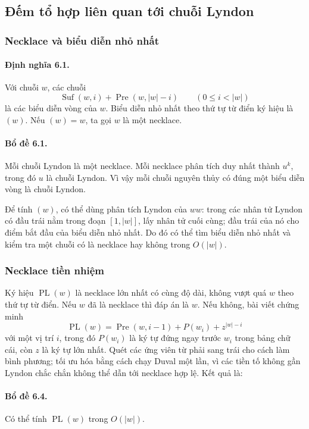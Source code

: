 \documentclass[11pt]{article}
\begin{document}
\subsection{Đếm tổ hợp liên quan tới chuỗi Lyndon}

\subsubsection{Necklace và biểu diễn nhỏ nhất}

\paragraph{Định nghĩa 6.1.}
Với chuỗi $w$, các chuỗi
\[
  \operatorname{Suf}(w,i)+\operatorname{Pre}(w,|w|-i)
  \qquad (0\le i<|w|)
\]
là các biểu diễn vòng của $w$. Biểu diễn nhỏ nhất theo thứ tự từ điển ký hiệu là
$(w)$. Nếu $(w)=w$, ta gọi $w$ là một necklace.

\paragraph{Bổ đề 6.1.}
Mỗi chuỗi Lyndon là một necklace. Mỗi necklace phân tích duy nhất thành $u^k$,
trong đó $u$ là chuỗi Lyndon. Vì vậy mỗi chuỗi nguyên thủy có đúng một biểu diễn
vòng là chuỗi Lyndon.

Để tính $(w)$, có thể dùng phân tích Lyndon của $ww$: trong các nhân tử Lyndon
có đầu trái nằm trong đoạn $[1,|w|]$, lấy nhân tử cuối cùng; đầu trái của nó cho
điểm bắt đầu của biểu diễn nhỏ nhất. Do đó có thể tìm biểu diễn nhỏ nhất và kiểm
tra một chuỗi có là necklace hay không trong $O(|w|)$.

\subsubsection{Necklace tiền nhiệm}

Ký hiệu $\operatorname{PL}(w)$ là necklace lớn nhất có cùng độ dài, không vượt
quá $w$ theo thứ tự từ điển. Nếu $w$ đã là necklace thì đáp án là $w$. Nếu không,
bài viết chứng minh
\[
  \operatorname{PL}(w)
  =
  \operatorname{Pre}(w,i-1)+P(w_i)+z^{|w|-i}
\]
với một vị trí $i$, trong đó $P(w_i)$ là ký tự đứng ngay trước $w_i$ trong bảng
chữ cái, còn $z$ là ký tự lớn nhất. Quét các ứng viên từ phải sang trái cho cách
làm bình phương; tối ưu hóa bằng cách chạy Duval một lần, vì các tiền tố không
gần Lyndon chắc chắn không thể dẫn tới necklace hợp lệ. Kết quả là:

\paragraph{Bổ đề 6.4.}
Có thể tính $\operatorname{PL}(w)$ trong $O(|w|)$.
\end{document}
